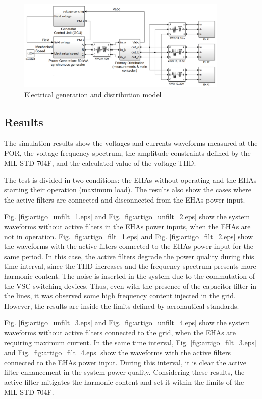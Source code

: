 \begin{figure}[!tb] %
	\centering
	\includegraphics[width=0.9\textwidth]{Figures/simulacao_simulink.png}
	\caption{Electrical generation and distribution model}
	\label{fig:simulacao_simulink.png}
\end{figure}

\subsection{Results}

The simulation results show the voltages and currents waveforms measured at the POR, the voltage frequency spectrum, the amplitude constraints defined by the MIL-STD 704F, and the calculated value of the voltage THD.

The test is divided in two conditions: the EHAs without operating and the EHAs starting their operation (maximum load). The results also show the cases where the active filters are connected and disconnected from the EHAs power input.

Fig. \ref{fig:artigo_unfilt_1.eps} and Fig. \ref{fig:artigo_unfilt_2.eps} show the system waveforms without active filters in the EHAs power inputs, when the EHAs are not in operation. Fig. \ref{fig:artigo_filt_1.eps} and Fig. \ref{fig:artigo_filt_2.eps} show the waveforms with the active filters connected to the EHAs power input for the same period. In this case, the active filters degrade the power quality during this time interval, since the THD increases and the frequency spectrum presents more harmonic content. The noise is inserted in the system due to the commutation of the VSC switching devices. Thus, even with the presence of the capacitor filter in the lines, it was observed some high frequency content injected in the grid. However, the results are inside the limits defined by aeronautical standards.

Fig. \ref{fig:artigo_unfilt_3.eps} and Fig. \ref{fig:artigo_unfilt_4.eps} show the system waveforms without active filters connected to the grid, when the EHAs are requiring maximum current. In the same time interval, Fig. \ref{fig:artigo_filt_3.eps} and Fig. \ref{fig:artigo_filt_4.eps} show the waveforms with the active filters connected to the EHAs power input. During this interval, it is clear the active filter enhancement in the system power quality. Considering these results, the active filter mitigates the harmonic content and set it within the limits of the MIL-STD 704F.

